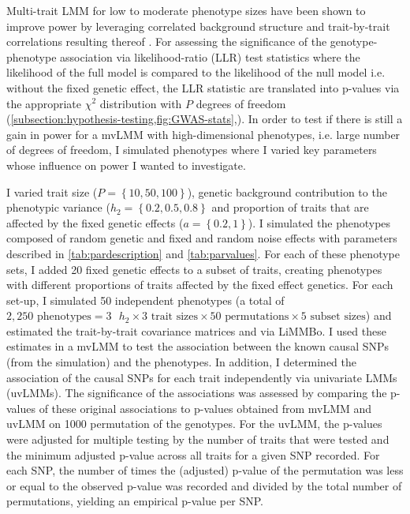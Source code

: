 Multi-trait LMM for low to moderate phenotype sizes have been shown to improve power by leveraging correlated background structure and trait-by-trait correlations resulting thereof \citep{Casale2015}. For assessing the significance of the genotype-phenotype association via likelihood-ratio (LLR) test statistics where the likelihood of the full model is compared to the likelihood of the null model i.e. without the fixed genetic effect, the LLR statistic are translated into p-values via the appropriate \(\chi^2\) distribution with \(P\) degrees of freedom (\cref{subsection:hypothesis-testing,fig:GWAS-stats},\citep{Wilks1938}).  In order to test if there is still a gain in power for a mvLMM with high-dimensional phenotypes, i.e. large number of degrees of freedom, I simulated phenotypes where I varied key parameters whose influence on power I wanted to investigate. 

I varied trait size (\(P=\left\{10,50,100\right\}\)), genetic background contribution to the phenotypic variance (\(h_2=\left\{0.2,0.5,0.8\right\}\) and proportion of traits that are affected by the fixed genetic effects (\(a=\left\{0.2, 1\right\}\)). I simulated the phenotypes composed of random genetic and fixed and random noise effects with parameters described in \cref{tab:pardescription} and \cref{tab:parvalues}. For each of these phenotype sets, I added \num{20} fixed genetic effects to a subset of traits, creating phenotypes with different proportions of traits affected by the fixed effect genetics.  For each set-up, I simulated \num{50} independent phenotypes (a total of \( 2,250 \text{ phenotypes} = 3\text{ }h_2 \times 3 \text{ trait sizes} \times 50 \text{ permutations} \times 5 \text{ subset sizes}\)) and estimated the trait-by-trait covariance matrices  and  via LiMMBo. I used these estimates in a mvLMM to test the association between the known causal SNPs (from the simulation) and the phenotypes. In addition, I determined the association of the causal SNPs for each trait independently via univariate LMMs (uvLMMs). The significance of the associations was assessed by comparing the p-values of these original associations to p-values obtained from mvLMM and uvLMM on \num{1000} permutation of the genotypes.  For the uvLMM,  the p-values were adjusted for multiple testing by the number of traits that were tested and the minimum adjusted p-value across all traits for a given SNP recorded. For each SNP, the number of times the (adjusted) p-value of the permutation was less or equal to the observed p-value was recorded and divided by the total number of permutations, yielding an empirical p-value per SNP.

